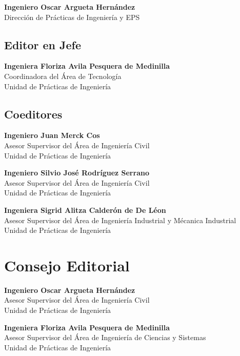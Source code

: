 \documentclass[11pt,spanish,Letterpaper,openany]{book}
\begin{document}
\textbf{Ingeniero Oscar Argueta Hernández}\\
Dirección de Prácticas de Ingeniería y EPS
\bigskip

\hypertarget{editor-en-jefe}{%
\subsection*{Editor en Jefe}\label{editor-en-jefe}}

\textbf{Ingeniera Floriza Avila Pesquera de Medinilla}\\
Coordinadora del Área de Tecnología\\
Unidad de Prácticas de Ingeniería
\bigskip

\hypertarget{coeditores}{%
\subsection*{Coeditores}\label{coeditores}}

\textbf{Ingeniero Juan Merck Cos}\\
Asesor Supervisor del Área de Ingeniería Civil\\
Unidad de Prácticas de Ingeniería
\bigskip

\textbf{Ingeniero Silvio José Rodríguez Serrano}\\
Asesor Supervisor del Área de Ingeniería Civil\\
Unidad de Prácticas de Ingeniería
\bigskip

\textbf{Ingeniera Sigrid Alitza Calderón de De Léon}\\
Asesor Supervisor del Área de Ingeniería Industrial y Mécanica Industrial\\
Unidad de Prácticas de Ingeniería

\hypertarget{consejo-editorial}{%
\section*{Consejo Editorial}\label{consejo-editorial}}

\textbf{Ingeniero Oscar Argueta Hernández}\\
Asesor Supervisor del Área de Ingeniería Civil\\
Unidad de Prácticas de Ingeniería
\bigskip

\textbf{Ingeniera Floriza Avila Pesquera de Medinilla}\\
Asesor Supervisor del Área de Ingeniería de Ciencias y Sistemas\\
Unidad de Prácticas de Ingeniería
\bigskip
\end{document}
